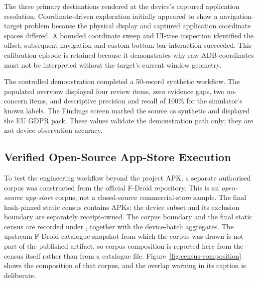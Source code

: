 The three primary destinations rendered at the device's captured application resolution. Coordinate-driven exploration initially appeared to show a navigation-target problem because the physical display and captured application coordinate spaces differed. A bounded coordinate sweep and UI-tree inspection identified the offset; subsequent navigation and custom bottom-bar interaction succeeded. This calibration episode is retained because it demonstrates why raw ADB coordinates must not be interpreted without the target's current window geometry.

The controlled demonstration completed a 50-record synthetic workflow. The populated overview displayed four review items, zero evidence gaps, two no-concern items, and descriptive precision and recall of 100\% for the simulator's known labels. The Findings screen marked the source as synthetic and displayed the EU GDPR pack. These values validate the demonstration path only; they are not device-observation accuracy.

\subsection{Verified Open-Source App-Store Execution}

To test the engineering workflow beyond the project APK, a separate authorised corpus was constructed from the official F-Droid repository. This is an \emph{open-source app-store} corpus, not a closed-source commercial-store sample. The final hash-pinned static census contains \FDroidCensusN{} APKs; the device subset and its exclusion boundary are separately receipt-owned. The corpus boundary and the final static census are recorded under , together with the device-batch aggregates. The upstream F-Droid catalogue snapshot from which the corpus was drawn is not part of the published artifact, so corpus composition is reported here from the census itself rather than from a catalogue file. Figure~\ref{fig:census-composition} shows the composition of that corpus, and the overlap warning in its caption is deliberate.

